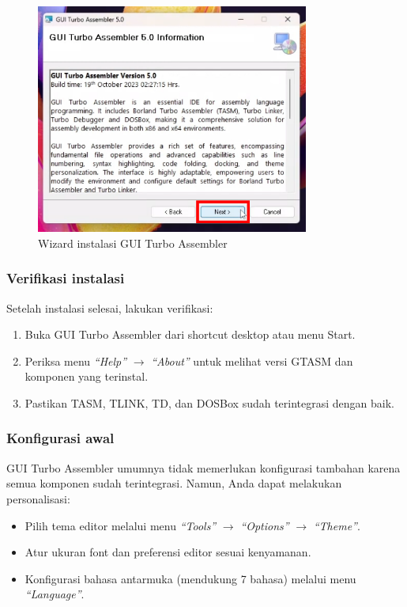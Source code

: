 \documentclass[../main.tex]{subfiles}
\begin{document}
            \begin{figure}[H]
\centering
\includegraphics[width=0.8\textwidth]{images/gtasm_installer.png}
\caption{Wizard instalasi GUI Turbo Assembler}
\label{fig:gtasm-installer}
            \end{figure}

            \subsubsection{Verifikasi instalasi}
Setelah instalasi selesai, lakukan verifikasi:
\begin{enumerate}
    \item Buka GUI Turbo Assembler dari shortcut desktop atau menu Start.
    \item Periksa menu \textit{``Help''} $\rightarrow$ \textit{``About''} untuk melihat versi GTASM dan komponen yang terinstal.
    \item Pastikan TASM, TLINK, TD, dan DOSBox sudah terintegrasi dengan baik.
\end{enumerate}

            \subsubsection{Konfigurasi awal}
GUI Turbo Assembler umumnya tidak memerlukan konfigurasi tambahan karena semua komponen sudah terintegrasi. Namun, Anda dapat melakukan personalisasi:
\begin{itemize}
    \item Pilih tema editor melalui menu \textit{``Tools''} $\rightarrow$ \textit{``Options''} $\rightarrow$ \textit{``Theme''}.
    \item Atur ukuran font dan preferensi editor sesuai kenyamanan.
    \item Konfigurasi bahasa antarmuka (mendukung 7 bahasa) melalui menu \textit{``Language''}.
\end{itemize}
\end{document}
